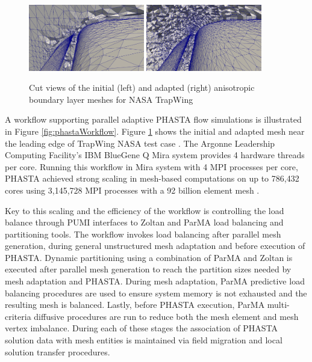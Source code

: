 \begin{figure}
\begin{center}
\includegraphics[width=0.45\textwidth]{TrapWing_Cut_LeadingEdge_Init.png}
\includegraphics[width=0.45\textwidth]{TrapWing_Cut_LeadingEdge_Adapt2.png}
\end{center}
\caption{Cut views of the initial (left) and adapted (right) anisotropic
boundary layer meshes for NASA TrapWing \cite{chitale-aiaa14}}
\label{fig:phasta-mesh}
\end{figure}

A workflow supporting parallel adaptive PHASTA flow simulations is illustrated in
Figure \ref{fig:phastaWorkflow}.
Figure \ref{fig:phasta-mesh} shows the initial
and adapted mesh near the leading edge of TrapWing NASA test
case \cite{chitale-aiaa14}.
The Argonne Leadership Computing Facility's IBM
BlueGene Q Mira system provides 4 hardware threads per core.
Running this workflow in Mira system with 4 MPI processes per core,
PHASTA achieved strong scaling
in mesh-based computations on up to 786,432 cores using 3,145,728 MPI processes
with a 92 billion element mesh \cite{rasquinCise2014}.

Key to this scaling and the efficiency of the workflow is controlling the load
balance through PUMI interfaces to Zoltan and ParMA load balancing and
partitioning tools. The workflow invokes load balancing after parallel mesh
generation, during general unstructured mesh adaptation and before execution of
PHASTA. Dynamic partitioning using a combination of ParMA and Zoltan is executed
after parallel mesh generation to reach the partition sizes needed by mesh
adaptation and PHASTA.  During mesh adaptation, ParMA predictive load balancing
procedures are used to ensure system memory is not exhausted and the resulting
mesh is balanced.  Lastly, before PHASTA execution, ParMA multi-criteria
diffusive procedures are run to reduce both the mesh element and mesh vertex
imbalance.  During each of these stages the association of PHASTA solution data
with mesh entities is maintained via field migration and local solution
transfer procedures.

